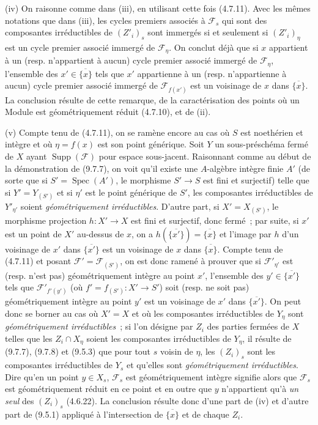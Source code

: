 (iv) On raisonne comme dans (iii), en utilisant cette fois (4.7.11). Avec les
mêmes notations que dans (iii), les cycles premiers associés à $\mathcal F_s$
qui sont des composantes irréductibles de $(Z'_i)_s$ sont immergés si et
seulement si $(Z'_i)_\eta$ est un cycle premier associé immergé de
$\mathcal F_\eta$. On conclut déjà que si $x$ appartient à un (resp.
n'appartient à aucun) cycle premier associé immergé de $\mathcal F_\eta$,
l'ensemble des $x'\in\overline{\{x\}}$ tels que $x'$ appartienne à un (resp.
n'appartienne à aucun) cycle premier associé immergé de $\mathcal F_{f(x')}$
est un voisinage de $x$ dans $\overline{\{x\}}$. La conclusion résulte de cette
remarque, de la caractérisation des points où un Module est géométriquement
réduit (4.7.10), et de (ii).

(v) Compte tenu de (4.7.11), on se ramène encore au cas où $S$ est noethérien
et intègre et où $\eta=f(x)$ est son point générique. Soit $Y$ un
sous-préschéma fermé de $X$ ayant $\operatorname{Supp}(\mathcal F)$ pour espace
sous-jacent. Raisonnant comme au début de la démonstration de (9.7.7), on voit
qu'il existe une $A$-algèbre intègre finie $A'$ (de sorte que si
$S'=\operatorname{Spec}(A')$, le morphisme $S'\to S$ est fini et surjectif)
telle que si $Y'=Y_{(S')}$ et si $\eta'$ est le point générique de $S'$, les
composantes irréductibles de $Y'_{\eta'}$ soient \emph{géométriquement irréductibles}.
D'autre part, si $X'=X_{(S')}$, le morphisme projection $h:X'\to X$ est fini
et surjectif, donc fermé~; par suite, si $x'$ est un point de $X'$ au-dessus de
$x$, on a $h(\overline{\{x'\}})=\overline{\{x\}}$ et l'image par $h$ d'un
voisinage de $x'$ dans $\overline{\{x'\}}$ est un voisinage de $x$ dans
$\overline{\{x\}}$. Compte tenu de (4.7.11) et posant
$\mathcal F'=\mathcal F_{(S')}$, on est donc ramené à prouver que si
$\mathcal F'_{\eta'}$ est (resp. n'est pas) géométriquement intègre au point
$x'$, l'ensemble des $y'\in\overline{\{x'\}}$ tels que
$\mathcal F'_{f'(y')}$ (où $f'=f_{(S')}:X'\to S'$) soit (resp. ne soit pas)
géométriquement intègre au point $y'$ est un voisinage de $x'$ dans
$\overline{\{x'\}}$. On peut donc se borner au cas où $X'=X$ et où les
composantes irréductibles de $Y_\eta$ sont \emph{géométriquement irréductibles}~; si
l'on désigne par $Z_i$ des parties fermées de $X$ telles que les
$Z_i\cap X_\eta$ soient les
composantes irréductibles de $Y_\eta$, il résulte de (9.7.7), (9.7.8) et
(9.5.3) que pour tout $s$ voisin de $\eta$, les $(Z_i)_s$ sont les composantes
irréductibles de $Y_s$ et qu'elles sont \emph{géométriquement irréductibles}.
Dire qu'en un point $y\in X_s$, $\mathcal F_s$ est géométriquement intègre
signifie alors que $\mathcal F_s$ est géométriquement réduit en ce point et en
outre que $y$ n'appartient qu'à \emph{un seul} des $(Z_i)_s$ (4.6.22). La
conclusion résulte donc d'une part de (iv) et d'autre part de (9.5.1) appliqué à
l'intersection de $\overline{\{x\}}$ et de chaque $Z_i$.

